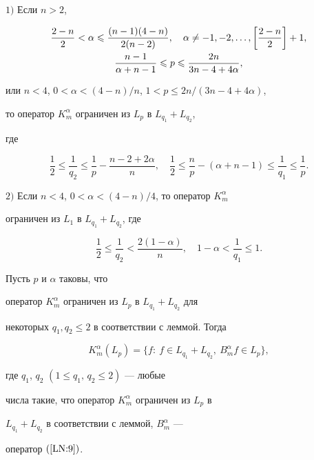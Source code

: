 \begin{lemnonum}


$1)$ Если $n>2$,


\begin{gather*}


\dst \frac{2-n}{2}<\alpha \leqslant \frac{(n-1)(4-n)}{2(n-2)},\quad


\alpha\ne -1,-2,\dotsc,\left[\frac{2-n}2\right]+1,\\


\dst \frac{n-1}{\alpha+n-1} \leqslant p  \leqslant


\frac{2n}{3n-4+4\alpha},


\end{gather*}


или  ${n<4}$, $0<\alpha<(4-n)/n$,  $1<p\leqslant


2n/(3n-4+4\alpha)$,


то оператор $K_m^\alpha$ ограничен из $L_p$ в $L_{q_1}+L_{q_2}$,


где


$$


\frac12 \leqslant \frac{1}{q_2} \leqslant


\frac1p-\frac{n-2+2\alpha}{n}, \quad \frac12 \leqslant \frac np-(\alpha+n-1)


\leqslant \frac{1}{q_1} \leqslant \frac 1p.


$$





$2)$ Если $n<4$, $0<\alpha<(4-n)/4$, то оператор $K_m^\alpha$


ограничен из $L_1$ в $L_{q_1}+L_{q_2}$, где


$$


\frac12 \leqslant \frac{1}{q_2} < \frac{2(1-\alpha)}{n}, \quad


1-\alpha<\frac{1}{q_1} \leqslant 1.


$$


\end{lemnonum}





\begin{thm}


Пусть $p$ и $\alpha$ таковы, что


оператор $K_m^\alpha$ ограничен из $L_p$ в $L_{q_1}+L_{q_2}$ для


некоторых $q_1, q_2 \leqslant 2$ в соответствии с леммой. Тогда


$$


K_m^\alpha(L_p)=\{f:\ f\in L_{q_1}+L_{q_2},\ B_m^\alpha f\in L_p\},


$$


где $q_1$, $q_2$ $(1\leqslant q_1,\, q_2\leqslant 2)$ --- любые


числа такие, что оператор $K_m^\alpha$ ограничен из $L_p$ в


$L_{q_1}+L_{q_2}$ в соответствии с леммой, $B_m^\alpha$ ---


оператор $(\ref{LN:9})$.


\end{thm}





